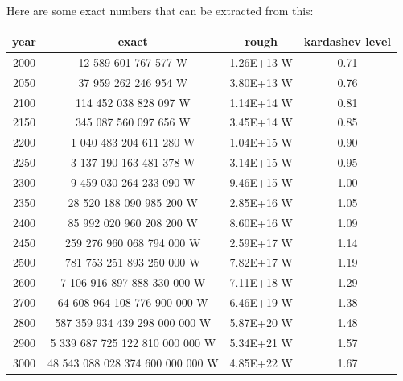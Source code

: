 \documentclass[a4paper]{article}
\begin{document}
	\bigskip
	
	
	Here are some exact numbers that can be extracted from this:
	
	\begin{center}
		\begin{tabular}{c | c | c | c}
			year & exact & rough & kardashev level \\\hline
			2000 & 12 589 601 767 577 W & 1.26E+13 W & 0.71 \\\hline
			2050 & 37 959 262 246 954 W & 3.80E+13 W & 0.76 \\\hline
			2100 & 114 452 038 828 097 W & 1.14E+14 W & 0.81 \\\hline
			2150 & 345 087 560 097 656 W & 3.45E+14 W & 0.85 \\\hline
			2200 & 1 040 483 204 611 280 W & 1.04E+15 W & 0.90 \\\hline
			2250 & 3 137 190 163 481 378 W & 3.14E+15 W & 0.95 \\\hline
			2300 & 9 459 030 264 233 090 W & 9.46E+15 W & 1.00 \\\hline
			2350 & 28 520 188 090 985 200 W & 2.85E+16 W & 1.05 \\\hline
			2400 & 85 992 020 960 208 200 W & 8.60E+16 W & 1.09 \\\hline
			2450 & 259 276 960 068 794 000 W & 2.59E+17 W & 1.14 \\\hline
			2500 & 781 753 251 893 250 000 W & 7.82E+17 W & 1.19 \\\hline
			2600 & 7 106 916 897 888 330 000 W & 7.11E+18 W & 1.29 \\\hline
			2700 & 64 608 964 108 776 900 000 W & 6.46E+19 W & 1.38 \\\hline
			2800 & 587 359 934 439 298 000 000 W & 5.87E+20 W & 1.48 \\\hline
			2900 & 5 339 687 725 122 810 000 000 W & 5.34E+21 W & 1.57 \\\hline
			3000 & 48 543 088 028 374 600 000 000 W & 4.85E+22 W & 1.67
		\end{tabular}
	\end{center}
	
\end{document}
